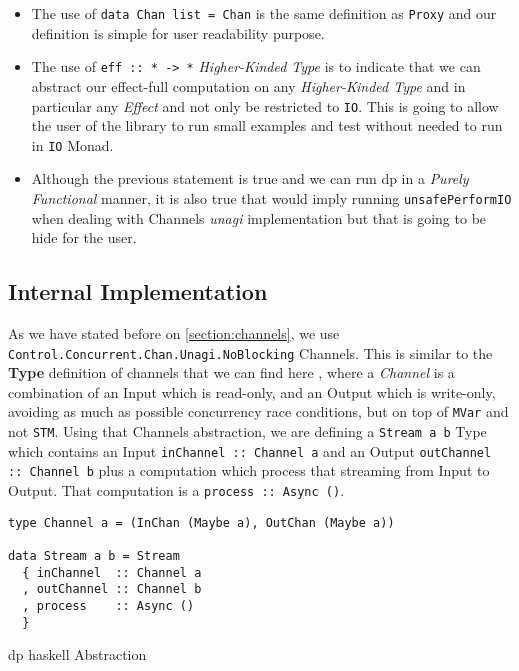 \documentclass[preprint]{elsarticle}
\begin{document}
\begin{itemize}
    \item The use of \texttt{data Chan list = Chan} is the same definition as \texttt{Proxy} and our definition is simple for user readability purpose.
    \item The use of \texttt{eff :: * -> *} \emph{Higher-Kinded Type} is to indicate that we can abstract our effect-full computation on any \emph{Higher-Kinded Type} and in particular any \emph{Effect} and not only be restricted to \texttt{IO}. This is going to allow the user of the library to run small examples and test without needed to run in \texttt{IO} Monad.
    \item Although the previous statement is true and we can run \acrshort{dp} in a \emph{Purely Functional} manner, it is also true that would imply running \texttt{unsafePerformIO} when dealing with Channels \emph{unagi} implementation but that is going to be hide for the user.
\end{itemize}

\subsection{Internal Implementation}\label{sub:inter:impl}
As we have stated before on \autoref{section:channels}, we use 
\texttt{Control.Concurrent.Chan.Unagi.NoBlocking} Channels. 
This is similar to the \textbf{Type} definition of channels that we can find here \citep{parallelbook}, where a \emph{Channel} is a combination of an Input which is read-only, and an Output which is write-only, avoiding as much as possible concurrency race conditions, but on top of \texttt{MVar} and not \texttt{STM}. 
Using that Channels abstraction, we are defining a \texttt{Stream a b} Type which contains an Input \texttt{inChannel :: Channel a} and an Output \texttt{outChannel :: Channel b} 
plus a computation which process that streaming from Input to Output. That computation is a \texttt{process :: Async ()}.

\begin{listing}[H]
\begin{verbatim}  
type Channel a = (InChan (Maybe a), OutChan (Maybe a))

data Stream a b = Stream
  { inChannel  :: Channel a
  , outChannel :: Channel b
  , process    :: Async ()
  }

\end{verbatim}
\caption{\acrshort{dp} \acrshort{haskell} Abstraction}
\label{src:haskell:4}
\end{listing}
\end{document}

